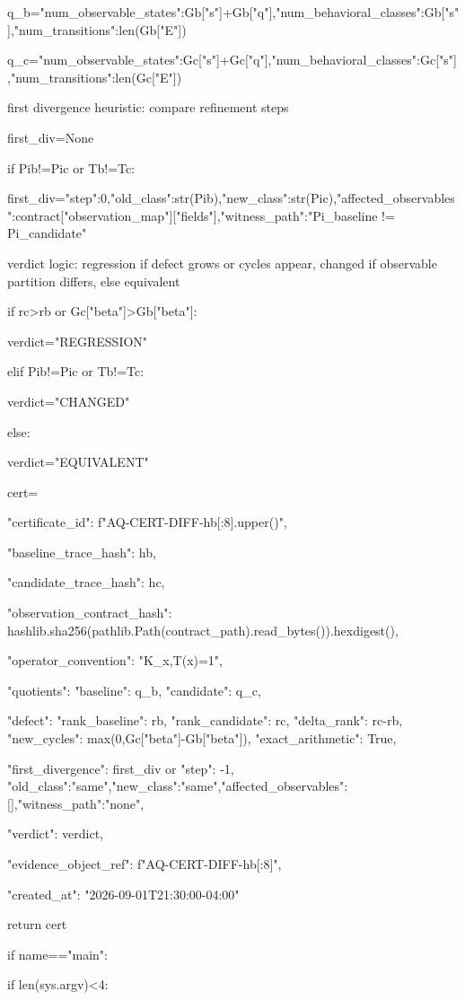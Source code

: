 q_b={"num_observable_states":Gb["s"]+Gb["q"],"num_behavioral_classes":Gb["s"],"num_transitions":len(Gb["E"])}

q_c={"num_observable_states":Gc["s"]+Gc["q"],"num_behavioral_classes":Gc["s"],"num_transitions":len(Gc["E"])}


first divergence heuristic: compare refinement steps


first_div=None

if Pib!=Pic or Tb!=Tc:

first_div={"step":0,"old_class":str(Pib),"new_class":str(Pic),"affected_observables":contract["observation_map"]["fields"],"witness_path":"Pi_baseline != Pi_candidate"}


verdict logic: regression if defect grows or cycles appear, changed if observable partition differs, else equivalent


if rc>rb or Gc["beta"]>Gb["beta"]:

verdict="REGRESSION"

elif Pib!=Pic or Tb!=Tc:

verdict="CHANGED"

else:

verdict="EQUIVALENT"

cert={

"certificate_id": f"AQ-CERT-DIFF-{hb[:8].upper()}",

"baseline_trace_hash": hb,

"candidate_trace_hash": hc,

"observation_contract_hash": hashlib.sha256(pathlib.Path(contract_path).read_bytes()).hexdigest(),

"operator_convention": "K_x,T(x)=1",

"quotients": {"baseline": q_b, "candidate": q_c},

"defect": {"rank_baseline": rb, "rank_candidate": rc, "delta_rank": rc-rb, "new_cycles": max(0,Gc["beta"]-Gb["beta"]), "exact_arithmetic": True},

"first_divergence": first_div or {"step": -1, "old_class":"same","new_class":"same","affected_observables":[],"witness_path":"none"},

"verdict": verdict,

"evidence_object_ref": f"AQ-CERT-DIFF-{hb[:8]}",

"created_at": "2026-09-01T21:30:00-04:00"

}

return cert


if name=="main":

if len(sys.argv)<4:

